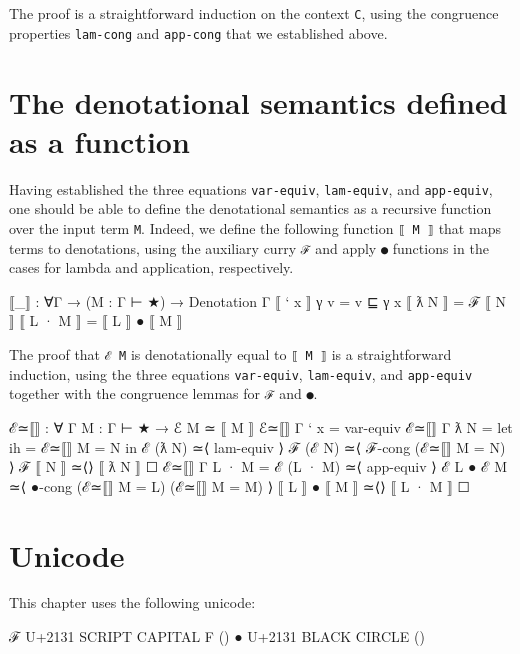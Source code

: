 The proof is a straightforward induction on the context \texttt{C},
using the congruence properties \texttt{lam-cong} and \texttt{app-cong}
that we established above.

\hypertarget{the-denotational-semantics-defined-as-a-function}{%
\section{The denotational semantics defined as a
function}\label{the-denotational-semantics-defined-as-a-function}}

Having established the three equations \texttt{var-equiv},
\texttt{lam-equiv}, and \texttt{app-equiv}, one should be able to define
the denotational semantics as a recursive function over the input term
\texttt{M}. Indeed, we define the following function \texttt{⟦\ M\ ⟧}
that maps terms to denotations, using the auxiliary curry \texttt{ℱ} and
apply \texttt{●} functions in the cases for lambda and application,
respectively.

\begin{fence}
\begin{code}
⟦_⟧ : ∀{Γ} → (M : Γ ⊢ ★) → Denotation Γ
⟦ ` x ⟧ γ v = v ⊑ γ x
⟦ ƛ N ⟧ = ℱ ⟦ N ⟧
⟦ L · M ⟧ = ⟦ L ⟧ ● ⟦ M ⟧
\end{code}
\end{fence}

The proof that \texttt{ℰ\ M} is denotationally equal to \texttt{⟦\ M\ ⟧}
is a straightforward induction, using the three equations
\texttt{var-equiv}, \texttt{lam-equiv}, and \texttt{app-equiv} together
with the congruence lemmas for \texttt{ℱ} and \texttt{●}.

\begin{fence}
\begin{code}
ℰ≃⟦⟧ : ∀ {Γ} {M : Γ ⊢ ★} → ℰ M ≃ ⟦ M ⟧
ℰ≃⟦⟧ {Γ} {` x} = var-equiv
ℰ≃⟦⟧ {Γ} {ƛ N} =
  let ih = ℰ≃⟦⟧ {M = N} in
    ℰ (ƛ N)
  ≃⟨ lam-equiv ⟩
    ℱ (ℰ N)
  ≃⟨ ℱ-cong (ℰ≃⟦⟧ {M = N}) ⟩
    ℱ ⟦ N ⟧
  ≃⟨⟩
    ⟦ ƛ N ⟧
  ☐
ℰ≃⟦⟧ {Γ} {L · M} =
   ℰ (L · M)
  ≃⟨ app-equiv ⟩
   ℰ L ● ℰ M
  ≃⟨ ●-cong (ℰ≃⟦⟧ {M = L}) (ℰ≃⟦⟧ {M = M}) ⟩
   ⟦ L ⟧ ● ⟦ M ⟧
  ≃⟨⟩
    ⟦ L · M ⟧
  ☐
\end{code}
\end{fence}

\hypertarget{unicode}{%
\section{Unicode}\label{unicode}}

This chapter uses the following unicode:

\begin{myDisplay}
ℱ  U+2131  SCRIPT CAPITAL F (\McF)
●  U+2131  BLACK CIRCLE (\cib)
\end{myDisplay}

